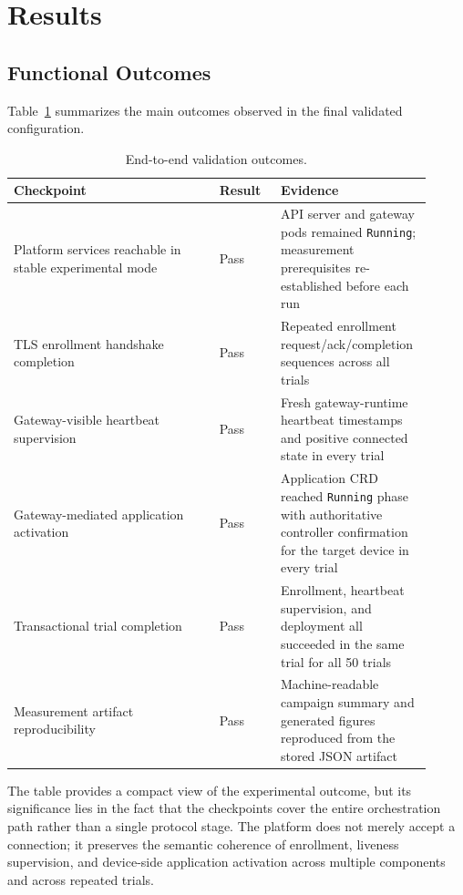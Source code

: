 \section{Results}

\subsection{Functional Outcomes}
Table~\ref{tab:results} summarizes the main outcomes observed in the final validated configuration.

\begin{table}[h]
\centering
\caption{End-to-end validation outcomes.}
\label{tab:results}
\begin{tabular}{p{0.47\linewidth} p{0.14\linewidth} p{0.30\linewidth}}
\toprule
\textbf{Checkpoint} & \textbf{Result} & \textbf{Evidence} \\
\midrule
Platform services reachable in stable experimental mode & Pass & API server and gateway pods remained \texttt{Running}; measurement prerequisites re-established before each run \\
TLS enrollment handshake completion & Pass & Repeated enrollment request/ack/completion sequences across all trials \\
Gateway-visible heartbeat supervision & Pass & Fresh gateway-runtime heartbeat timestamps and positive connected state in every trial \\
Gateway-mediated application activation & Pass & Application CRD reached \texttt{Running} phase with authoritative controller confirmation for the target device in every trial \\
Transactional trial completion & Pass & Enrollment, heartbeat supervision, and deployment all succeeded in the same trial for all 50 trials \\
Measurement artifact reproducibility & Pass & Machine-readable campaign summary and generated figures reproduced from the stored JSON artifact \\
\bottomrule
\end{tabular}
\end{table}

The table provides a compact view of the experimental outcome, but its significance lies in the fact that the checkpoints cover the entire orchestration path rather than a single protocol stage. The platform does not merely accept a connection; it preserves the semantic coherence of enrollment, liveness supervision, and device-side application activation across multiple components and across repeated trials.

